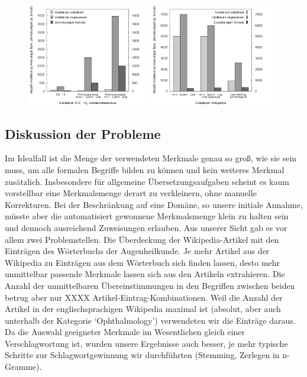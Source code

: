 \documentclass[pagesize,DIV=calc,12pt,draft]{scrreprt}
\begin{document}
\begin{figure}[!ht]
\includegraphics[width=0.48\textwidth]{icd10_affixe}
\hfill
\includegraphics[width=0.48\textwidth]{wiki_extraktion}
\end{figure}

\subsection{Diskussion der Probleme}

Im Idealfall ist die Menge der verwendeten Merkmale genau so groß, wie sie sein muss, um alle formalen Begriffe bilden zu können und kein weiteres Merkmal zusätzlich. 
Insbesondere für allgemeine Übersetzungsaufgaben scheint es kaum vorstellbar eine Merkmalsmenge derart zu verkleinern, ohne manuelle Korrekturen. 
Bei der Beschränkung auf eine Domäne, so unsere initiale Annahme, müsste aber die automatisiert gewonnene Merkmalsmenge klein zu halten sein und dennoch ausreichend Zuweisungen erlauben. 
Aus unserer Sicht gab es vor allem zwei Problemstellen. 
Die Überdeckung der Wikipedia-Artikel mit den Einträgen des Wörterbuchs der Augenheilkunde. 
Je mehr Artikel aus der Wikipedia zu Einträgen aus dem Wörterbuch sich finden lassen, desto mehr unmittelbar passende Merkmale lassen sich aus den Artikeln extrahieren. 
Die Anzahl der unmittelbaren Übereinstimmungen in den Begriffen zwischen beiden betrug aber nur XXXX Artikel-Eintrag-Kombinationen. 
Weil die Anzahl der Artikel in der englischsprachigen Wikipedia maximal ist (absolut, aber auch unterhalb der Kategorie `Ophthalmology') verwendeten wir die Einträge daraus. 
Da die Auswahl geeigneter Merkmale im Wesentlichen gleich einer Verschlagwortung ist, wurden unsere Ergebnisse auch besser, je mehr typische Schritte zur Schlagwortgewinnung wir durchführten (Stemming, Zerlegen in n-Gramme). 
\end{document}
